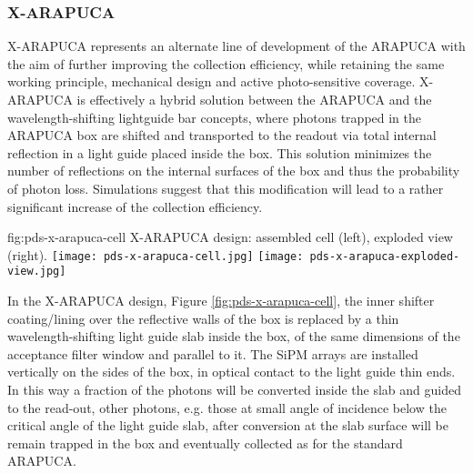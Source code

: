 
\subsubsection{X-ARAPUCA} 
\label{sssec:x-arapuca}
X-ARAPUCA represents  an alternate line of development of the ARAPUCA  with the aim of further improving the collection efficiency, while retaining the same working principle, mechanical design and active  photo-sensitive coverage. X-ARAPUCA is effectively a hybrid solution between the ARAPUCA and the wavelength-shifting lightguide bar  concepts, where photons trapped in the ARAPUCA box are shifted and transported to the readout via total internal reflection in a light guide placed inside the box.
This solution minimizes the number of reflections on the internal surfaces of the box and thus the probability of photon loss. Simulations suggest that this modification will lead to a rather significant increase of the collection efficiency.

 \begin{dunefigure}{fig:pds-x-arapuca-cell}
{X-ARAPUCA design: assembled cell (left),  exploded view (right).}
  \texttt{[image: pds-x-arapuca-cell.jpg]}
  \texttt{[image: pds-x-arapuca-exploded-view.jpg]}
\end{dunefigure}


In the X-ARAPUCA design, Figure \ref{fig:pds-x-arapuca-cell}, the inner shifter coating/lining over the reflective walls of the box is replaced by a thin wavelength-shifting light guide slab inside the box, of the same dimensions of the acceptance filter window and parallel to it. The SiPM arrays are installed vertically on the sides of the box, in optical contact to the light guide thin ends. 
 In this way a fraction of the photons will be converted inside the slab and guided to the read-out, other photons,  e.g. those at small angle of incidence below the critical angle of the light guide slab, after conversion at the slab surface will be remain trapped in the box and eventually collected as for the standard ARAPUCA.
 
